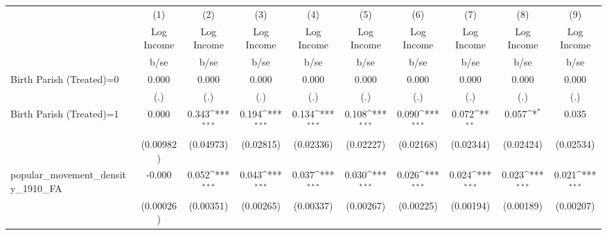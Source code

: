 {
\def\sym#1{\ifmmode^{#1}\else\(^{#1}\)\fi}
\begin{tabular}{l*{9}{c}}
\hline\hline
                    &\multicolumn{1}{c}{(1)}&\multicolumn{1}{c}{(2)}&\multicolumn{1}{c}{(3)}&\multicolumn{1}{c}{(4)}&\multicolumn{1}{c}{(5)}&\multicolumn{1}{c}{(6)}&\multicolumn{1}{c}{(7)}&\multicolumn{1}{c}{(8)}&\multicolumn{1}{c}{(9)}\\
                    &\multicolumn{1}{c}{Log Income}&\multicolumn{1}{c}{Log Income}&\multicolumn{1}{c}{Log Income}&\multicolumn{1}{c}{Log Income}&\multicolumn{1}{c}{Log Income}&\multicolumn{1}{c}{Log Income}&\multicolumn{1}{c}{Log Income}&\multicolumn{1}{c}{Log Income}&\multicolumn{1}{c}{Log Income}\\
                    &        b/se         &        b/se         &        b/se         &        b/se         &        b/se         &        b/se         &        b/se         &        b/se         &        b/se         \\
\hline
Birth Parish (Treated)=0&       0.000         &       0.000         &       0.000         &       0.000         &       0.000         &       0.000         &       0.000         &       0.000         &       0.000         \\
                    &         (.)         &         (.)         &         (.)         &         (.)         &         (.)         &         (.)         &         (.)         &         (.)         &         (.)         \\
Birth Parish (Treated)=1&       0.000         &       0.343\sym{***}&       0.194\sym{***}&       0.134\sym{***}&       0.108\sym{***}&       0.090\sym{***}&       0.072\sym{**} &       0.057\sym{*}  &       0.035         \\
                    &   (0.00982)         &   (0.04973)         &   (0.02815)         &   (0.02336)         &   (0.02227)         &   (0.02168)         &   (0.02344)         &   (0.02424)         &   (0.02534)         \\
popular\_movement\_density\_1910\_FA&      -0.000         &       0.052\sym{***}&       0.043\sym{***}&       0.037\sym{***}&       0.030\sym{***}&       0.026\sym{***}&       0.024\sym{***}&       0.023\sym{***}&       0.021\sym{***}\\
                    &   (0.00026)         &   (0.00351)         &   (0.00265)         &   (0.00337)         &   (0.00267)         &   (0.00225)         &   (0.00194)         &   (0.00189)         &   (0.00207)         \\

\end{tabular}}
